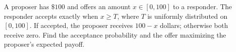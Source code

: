 A proposer has $\$100$ and offers an amount $x\in[0,100]$ to a responder. The responder accepts exactly when $x\ge T$, where $T$ is uniformly distributed on $[0,100]$. If accepted, the proposer receives $100-x$ dollars; otherwise both receive zero. Find the acceptance probability and the offer maximizing the proposer's expected payoff.
